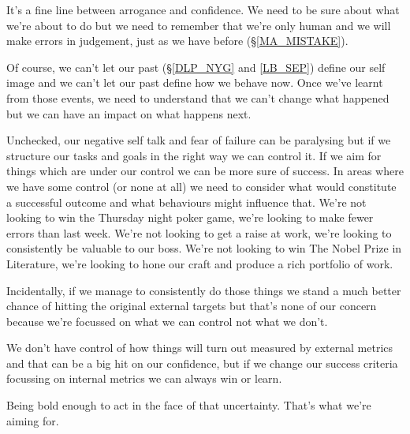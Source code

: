 \cleardoublepage
{\small

It's a fine line between arrogance and confidence. We need to be sure about what we're about to do but we need to remember that we're only human and we will make errors in judgement, just as we have before (\S \ref{MA_MISTAKE}). 

Of course, we can't let our past (\S \ref{DLP_NYG} and \ref{LB_SEP}) define our self image and we can't let our past define how we behave now. Once we've learnt from those events, we need to understand that we can't change what happened but we can have an impact on what happens next.

Unchecked, our negative self talk and fear of failure can be paralysing but if we structure our tasks and goals in the right way we can control it. If we aim for things which are under our control we can be more sure of success. In areas where we have some control (or none at all) we need to consider what would constitute a successful outcome and what behaviours might influence that. We're not looking to win the Thursday night poker game, we're looking to make fewer errors than last week. We're not looking to get a raise at work, we're looking to consistently be valuable to our boss. We're not looking to win The Nobel Prize in Literature, we're looking to hone our craft and produce a rich portfolio of work.

Incidentally, if we manage to consistently do those things we stand a much better chance of hitting the original external targets but that's none of our concern because we're focussed on what we can control not what we don't.

We don't have control of how things will turn out measured by external metrics and that can be a big hit on our confidence, but if we change our success criteria focussing on internal metrics we can always win or learn. 

Being bold enough to act in the face of that uncertainty. That's what we're aiming for.
}

